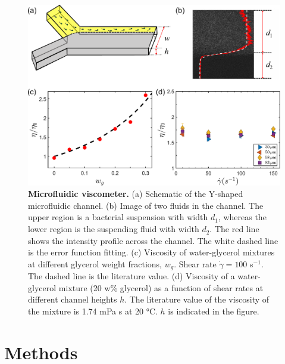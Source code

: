 \begin{figure}[!ht]
	\begin{center}
	\includegraphics[width=5.5 in]{Figs/3-Rheo/1.pdf}
	\end{center}
	\caption[Microfluidic viscometer.]
	{
	\textbf{Microfluidic viscometer.}
  (a) Schematic of the Y-shaped microfluidic channel.
  (b) Image of two fluids in the channel. The upper region is a bacterial suspension with width $d_1$, whereas the lower region is the suspending fluid with width $d_2$. The red line shows the intensity profile across the channel. The white dashed line is the error function fitting.
  (c) Viscosity of water-glycerol mixtures at different glycerol weight
  fractions, $w_g$. Shear rate $\dot\gamma = 100$ s$^{-1}$. The dashed line is the literature value.
  (d) Viscosity of a water-glycerol mixture (20 w\% glycerol) as a function of shear rates at different channel heights $h$. The literature value of the viscosity of the mixture is 1.74 mPa s at 20 °C. $h$ is indicated in the figure.
	}
	\label{fig:3-viscometer}
\end{figure}

\section{Methods}
